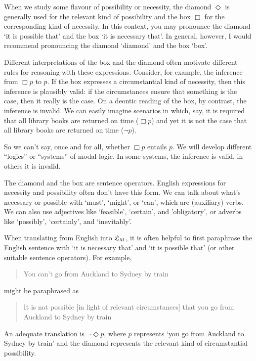 
When we study some flavour of possibility or necessity, the diamond $\Diamond$
is generally used for the relevant kind of possibility and the box $\Box$ for
the corresponding kind of necessity. In this context, you may pronounce the
diamond `it is possible that' and the box `it is necessary that'. In general,
however, I would recommend pronouncing the diamond `diamond' and the box `box'.


Different interpretations of the box and the diamond often motivate different
rules for reasoning with these expressions. Consider, for example, the inference
from $\Box p$ to $p$. If the box expresses a circumstantial kind of necessity,
then this inference is plausibly valid: if the circumstances ensure that
something is the case, then it really is the case. On a deontic reading of the
box, by contrast, the inference is invalid. We can easily imagine scenarios in
which, say, it is required that all library books are returned on time
($\Box p$) and yet it is not the case that all library books are returned on
time ($\neg p$).

So we can't say, once and for all, whether $\Box p$ entails $p$. We will develop
different ``logics'' or ``systems'' of modal logic. In some systems, the inference is
valid, in others it is invalid.


The diamond and the box are sentence operators. English expressions for
necessity and possibility often don't have this form. We can talk about what's
necessary or possible with `must', `might', or `can', which are (auxiliary)
verbs. We can also use adjectives like `feasible', `certain', and 'obligatory',
or adverbs like `possibly', `certainly', and `inevitably'.


When translating from English into $\mathfrak{L}_{M}$, it is often helpful to first
paraphrase the English sentence with `it is necessary that' and `it is possible
that' (or other suitable sentence operators). For example,
\begin{quote}
  You can't go from Auckland to Sydney by train
\end{quote}
might be paraphrased as
\begin{quote}
  It is not possible [in light of relevant circumstances] that you go from
  Auckland to Sydney by train
\end{quote}
An adequate translation is $\neg\Diamond p$, where $p$ represents `you go from
Auckland to Sydney by train' and the diamond represents the relevant kind of
circumstantial possibility.

